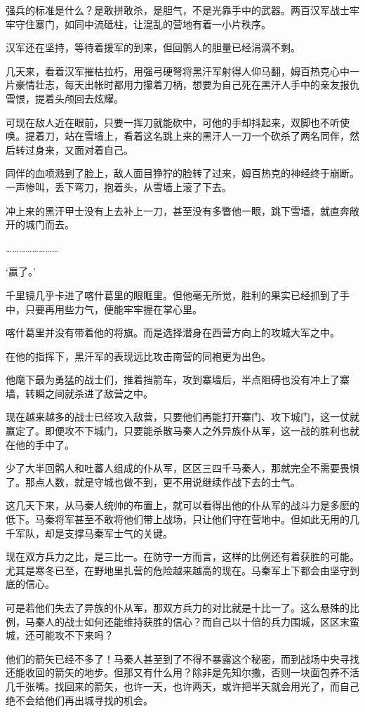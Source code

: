 强兵的标准是什么？是敢拼敢杀，是胆气，不是光靠手中的武器。两百汉军战士牢牢守住寨门，如同中流砥柱，让混乱的营地有着一小片秩序。

汉军还在坚持，等待着援军的到来，但回鹘人的胆量已经涓滴不剩。

几天来，看着汉军摧枯拉朽，用强弓硬弩将黑汗军射得人仰马翻，姆百热克心中一片豪情壮志，每天出帐时都用力攥着刀柄，想要为自己死在黑汗人手中的亲友报仇雪恨，提着头颅回去炫耀。

可现在敌人近在眼前，只要一挥刀就能砍中，可他的手却抖起来，双脚也不听使唤。提着刀，站在雪墙上，看着这名跳上来的黑汗人一刀一个砍杀了两名同伴，然后转过身来，又面对着自己。

同伴的血喷溅到了脸上，敌人面目狰狞的脸转了过来，姆百热克的神经终于崩断。一声惨叫，丢下弯刀，抱着头，从雪墙上滚了下去。

冲上来的黑汗甲士没有上去补上一刀，甚至没有多瞥他一眼，跳下雪墙，就直奔敞开的城门而去。

……………………

‘赢了。’

千里镜几乎卡进了喀什葛里的眼眶里。但他毫无所觉，胜利的果实已经抓到了手中，只要再用些力气，便能牢牢握在掌心里。

喀什葛里并没有带着他的将旗。而是选择潜身在西营方向上的攻城大军之中。

在他的指挥下，黑汗军的表现远比攻击南营的同袍更为出色。

他麾下最为勇猛的战士们，推着挡箭车，攻到寨墙后，半点阻碍也没有冲上了寨墙，转瞬之间就杀进了敌营之中。

现在越来越多的战士已经攻入敌营，只要他们再能打开寨门、攻下城门，这一仗就赢定了。即便攻不下城门，只要能杀散马秦人之外异族仆从军，这一战的胜利也就在他的手中了。

少了大半回鹘人和吐蕃人组成的仆从军，区区三四千马秦人，那就完全不需要畏惧了。那点人数，就是守城也做不到，更不用说继续作战下去的士气。

这几天下来，从马秦人统帅的布置上，就可以看得出他的仆从军的战斗力是多麽的低下。马秦将军甚至不敢将他们带上战场，只让他们守在营地中。但如此无用的几千军队，却是支撑马秦军士气的关键。

现在双方兵力之比，是三比一。在防守一方而言，这样的比例还有着获胜的可能。尤其是寒冬已至，在野地里扎营的危险越来越高的现在。马秦军上下都会由坚守到底的信心。

可是若他们失去了异族的仆从军，那双方兵力的对比就是十比一了。这么悬殊的比例，马秦人的战士如何还能维持获胜的信心？而自己以十倍的兵力围城，区区末蛮城，还可能攻不下来吗？

他们的箭矢已经不多了！马秦人甚至到了不得不暴露这个秘密，而到战场中央寻找还能收回的箭矢的地步。但那又有什么用？除非是先知尔撒，否则一块面包养不活几千张嘴。找回来的箭矢，也许一天，也许两天，或许把半天就会用光了，而自己绝不会给他们再出城寻找的机会。

